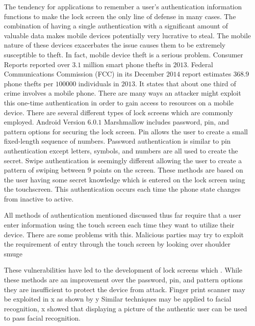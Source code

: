 The tendency for applications to remember a user's
authentication information functions
to make the lock screen the only line of defense in many cases.
%
The combination of
having a single authentication with a significant amount
of valuable data makes mobile devices
potentially very lucrative to steal.
%
The mobile nature of these devices 
exacerbates the issue
causes them to be extremely susceptible to theft.
%
In fact, mobile device theft is a serious problem.
Consumer Reports \cite{CR14} %
reported over $3.1$ million smart phone thefts in $2013$. 
Federal Communications Commission (FCC)\cite{FCC14} %
in its December $2014$ report 
estimates $368.9$ phone thefts per $100000$ individuals in $2013$. 
It states that about one third of crime involves a mobile phone.
%
There are many ways an attacker might
exploit this one-time authentication 
in order to gain access to resources on a mobile device.
There are several different types of
lock screens which are commonly employed.
Android Version $6.0.1$ Marshmallow includes
password, pin, and pattern options for
securing the lock screen.
%
Pin allows the user to create a small fixed-length sequence of numbers.
Password authentication is similar to pin authentication
except letters, symbols, and numbers
are all used to create the secret.
Swipe authentication is seemingly different
allowing the user to create a pattern of swiping
between $9$ points on the screen.
These methods are based on the user having some secret knowledge
which is entered 
on the lock screen
using the touchscreen.
This authentication occurs each time the phone state
changes from inactive to active.

All methods of authentication mentioned discussed thus far
require that a user enter information using the touch screen
each time they want to utilize their device.
%
There are some problems with this.
Malicious parties may try to 
exploit the requirement of entry through the
touch screen by
looking over shoulder
\cite{de2014now}
smuge
\cite{aviv2010smudge}

These vulnerabilities have led to the development of 
lock screens which .
While these methods are an improvement over the password, pin, and pattern options
they are insufficient to protect the device from attack.
%
Finger print scanner may be exploited in 
x \cite{cao2016hacking}%
as shown by 
y%
Similar techniques may be applied to facial recognition,
x%
showed that displaying a picture of the authentic user
can be used to pass facial recognition.

